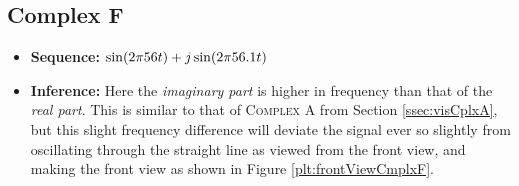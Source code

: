 \documentclass[../../course]{subfiles}
\begin{document}
\subsection{Complex F} \label{ssec:visCplxF}

\begin{itemize} [label=]

    \item \textbf{Sequence:} $\sin(2 \pi 56 t) + j \sin(2 \pi 56.1 t)$

    \item \textbf{Inference:} Here the \emph{imaginary part} is higher in frequency than
        that of the \emph{real part}. This is similar to that of \textsc{Complex A} from
        Section \ref{ssec:visCplxA}, but this slight frequency difference will deviate the
        signal ever so slightly from oscillating through the straight line as viewed from
        the front view, and making the front view as shown in Figure \ref{plt:frontViewCmplxF}.

\end{itemize}

\vfill
\end{document}
